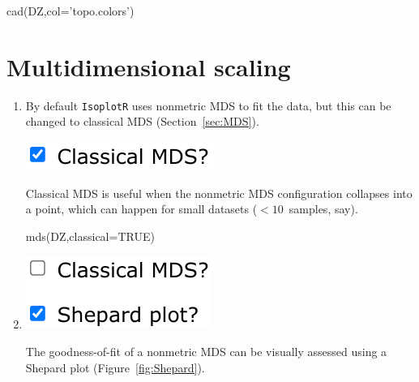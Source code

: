 \begin{refsection}
\begin{console}
cad(DZ,col='topo.colors')
\end{console}

\section{Multidimensional scaling}

\begin{enumerate}

\item By default \texttt{IsoplotR} uses nonmetric MDS to fit the data,
  but this can be changed to classical MDS (Section~\ref{sec:MDS}).
  
  \noindent\begin{minipage}[t]{.18\linewidth}
\strut\vspace*{-\baselineskip}\newline
\includegraphics[width=\linewidth]{../figures/detritalMDSclassical.png}
\end{minipage}
\begin{minipage}[t]{.82\linewidth}
Classical MDS is useful when the nonmetric MDS configuration collapses
into a point, which can happen for small datasets ($< 10$~samples,
say).
\end{minipage}

\begin{console}
mds(DZ,classical=TRUE)
\end{console}

\item\noindent\begin{minipage}[t]{.18\linewidth}
\strut\vspace*{-\baselineskip}\newline
\includegraphics[width=\linewidth]{../figures/detritalMDSshepard.png}
\end{minipage}
\begin{minipage}[t]{.82\linewidth}
The goodness-of-fit of a nonmetric MDS can be visually assessed using
a Shepard plot (Figure~\ref{fig:Shepard}).
\end{minipage}


\end{enumerate}
\end{refsection}
